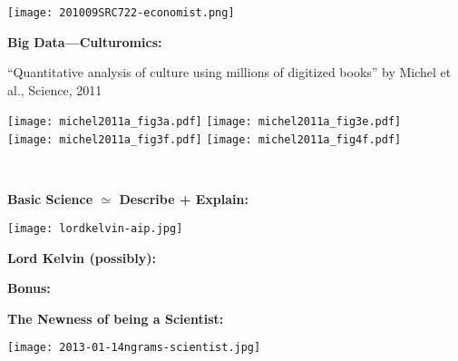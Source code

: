 \begin{frame}[plain]
\begin{frame}[plain]
  \texttt{[image: 201009SRC722-economist.png]}


  \textbf{Big Data---Culturomics:}

  \small{``Quantitative analysis of culture using millions of
    digitized books'' by Michel et al., Science, 2011\cite{michel2011a}}

  \texttt{[image: michel2011a\_fig3a.pdf]} 
  \texttt{[image: michel2011a\_fig3e.pdf]} \\
  \texttt{[image: michel2011a\_fig3f.pdf]}
  \texttt{[image: michel2011a\_fig4f.pdf]}

  {\small
    \\
  }



  \textbf{Basic Science $\simeq$ Describe + Explain:}

      
    \texttt{[image: lordkelvin-aip.jpg]}
    
    \textbf{Lord Kelvin (possibly):}
      
      
       
      
    
    \textbf{Bonus:}
      
      
      
      
    

  


  \textbf{The Newness of being a Scientist:}

  \texttt{[image: 2013-01-14ngrams-scientist.jpg]}




\end{frame}
\end{frame}

